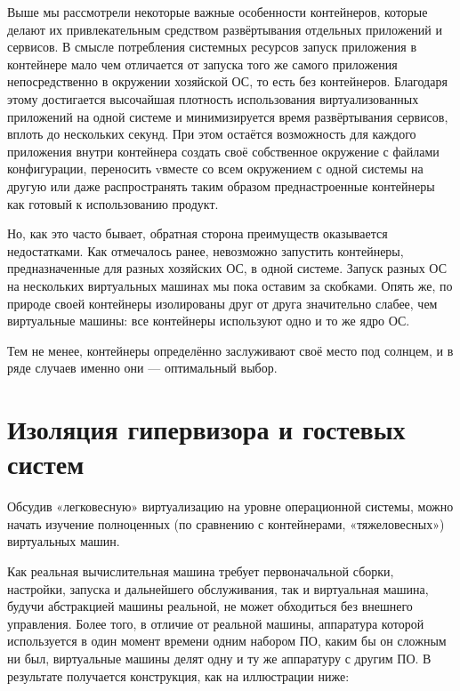 \documentclass[14pt, a4paper]{article}
\begin{document}
Выше мы рассмотрели некоторые важные особенности контейнеров, которые делают их
привлекательным средством развёртывания отдельных приложений и сервисов. В смысле
потребления системных ресурсов запуск приложения в контейнере мало чем отличается от запуска
того же самого приложения непосредственно в окружении хозяйской ОС, то есть без контейнеров.
Благодаря этому достигается высочайшая плотность использования виртуализованных приложений
на одной системе и минимизируется время развёртывания сервисов, вплоть до нескольких секунд.
При этом остаётся возможность для каждого приложения внутри контейнера создать своё
собственное окружение с файлами конфигурации, переносить vвместе со всем окружением
с одной системы на другую или даже распространять таким образом преднастроенные контейнеры
как готовый к использованию продукт.

Но, как это часто бывает, обратная сторона преимуществ оказывается недостатками. Как отмечалось
ранее, невозможно запустить контейнеры, предназначенные для разных хозяйских ОС, в одной
системе. Запуск разных ОС на нескольких виртуальных машинах мы пока оставим за скобками. Опять
же, по природе своей контейнеры изолированы друг от друга значительно слабее, чем виртуальные
машины: все контейнеры используют одно и то же ядро ОС.

Тем не менее, контейнеры определённо заслуживают своё место под солнцем, и в ряде случаев
именно они — оптимальный выбор.\newpage


\section*{Изоляция гипервизора и гостевых систем}


Обсудив «легковесную» виртуализацию на уровне операционной системы, можно начать изучение
полноценных (по сравнению с контейнерами, «тяжеловесных») виртуальных машин.

Как реальная вычислительная машина требует первоначальной сборки, настройки, запуска и
дальнейшего обслуживания, так и виртуальная машина, будучи абстракцией машины реальной, не
может обходиться без внешнего управления. Более того, в отличие от реальной машины, аппаратура
которой используется в один момент времени одним набором ПО, каким бы он сложным ни был,
виртуальные машины делят одну и ту же аппаратуру с другим ПО. В результате получается
конструкция, как на иллюстрации ниже:
\end{document}
